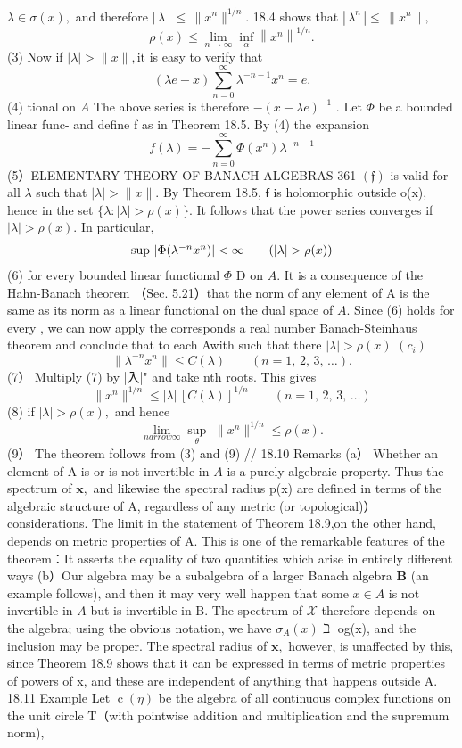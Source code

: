 $\lambda\in\sigma(x),$ and therefore $|\,\lambda\,|\,\leq\,\|x^{n}\|^{1/n}.$ 18.4 shows that $|\,\lambda^{n}\,|\leq\,\|x^{n}\|,$ $$ \rho(x)\leq\operatorname*{lim}_{n\to\infty}\operatorname*{inf}_{\alpha}\left\|x^{n}\right\|^{1/n}. $$ (3) Now if $|\lambda|>\|x\|,{\mathrm{it}}$ is easy to verify that $$ \left(\lambda e-x\right)\sum_{n=0}^{\infty}\lambda^{-n-1}x^{n}=e. $$ (4) tional on $\scriptstyle A$ The above series is therefore $-(x-\lambda e)^{-1}$ . Let $\Phi$ be a bounded linear func- and define f as in Theorem 18.5. By (4) the expansion $$ f(\lambda)=-\sum_{n=0}^{\infty}\Phi(x^{n})\lambda^{-n-1} $$ (5）ELEMENTARY THEORY OF BANACH ALGEBRAS 361 $({\mathfrak{f}})$ is valid for all $\lambda$ such that $|\lambda|>\|x\|.$ By Theorem 18.5, $\boldsymbol{\mathsf{f}}$ is holomorphic outside o(x), hence in the set $\{\lambda\colon|\lambda|>\rho(x)\}.$ It follows that the power series converges if $|\lambda|>\rho(x).$ In particular, $$ \begin{array}{c l}{{\mathrm{sup}\ |\Phi(\lambda^{-n}x^{n})|<\infty}}&{{\quad(|\lambda|>\rho(x))}}\end{array} $$ (6) for every bounded linear functional $\Phi$ D on $A.$ It is a consequence of the Hahn-Banach theorem （Sec. 5.21）that the norm of any element of A is the same as its norm as a linear functional on the dual space of $A.$ Since (6) holds for every , we can now apply the corresponds a real number Banach-Steinhaus theorem and conclude that to each Awith such that there $|\lambda|>\rho(x)$ $\scriptstyle(c_{i})$ $$ \|\lambda^{-n}x^{n}\|\leq C(\lambda)\qquad(n=1,\,2,\,3,\,\ldots). $$ (7） Multiply (7) by |入|" and take nth roots. This gives $$ \|x^{n}\|^{1/n}\leq|\lambda|\,[C(\lambda)]^{1/n}\qquad(n=1,\,2,\,3,\,\ldots) $$ (8) if $|\lambda|>\rho(x),$ and hence $$ \operatorname*{lim}_{n arrow\infty}\operatorname*{sup}_{\theta}\,\,\|x^{n}\|^{1/n}\leq\rho(x). $$ (9） The theorem follows from (3) and (9) // 18.10 Remarks (a） Whether an element of A is or is not invertible in $\scriptstyle A$ is a purely algebraic property. Thus the spectrum of ${\boldsymbol{x}},$ and likewise the spectral radius p(x) are defined in terms of the algebraic structure of A, regardless of any metric (or topological)） considerations. The limit in the statement of Theorem 18.9,on the other hand, depends on metric properties of A. This is one of the remarkable features of the theorem：It asserts the equality of two quantities which arise in entirely different ways (b）Our algebra may be a subalgebra of a larger Banach algebra $\boldsymbol{B}$ (an example follows), and then it may very well happen that some $x\in A$ is not invertible in $\scriptstyle A$ but is invertible in B. The spectrum of $\scriptstyle{\mathcal{X}}$ therefore depends on the algebra; using the obvious notation, we have $\sigma_{A}(x)\beth$ og(x), and the inclusion may be proper. The spectral radius of ${\boldsymbol{x}},$ however, is unaffected by this, since Theorem 18.9 shows that it can be expressed in terms of metric properties of powers of x, and these are independent of anything that happens outside A. 18.11 Example Let $\operatorname{c}(\eta)$ be the algebra of all continuous complex functions on the unit circle T（with pointwise addition and multiplication and the supremum norm), 